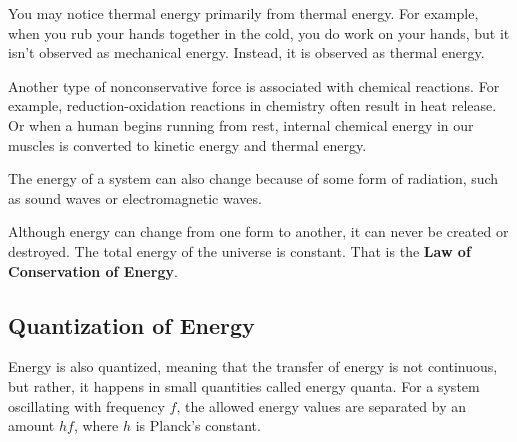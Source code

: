 \documentclass[11pt]{article}
\begin{document}
You may notice thermal energy primarily from thermal energy. For example, when you rub your hands together in the cold, you do work on your hands, but it isn't observed as mechanical energy. Instead, it is observed as thermal energy. 

Another type of nonconservative force is associated with chemical reactions. For example, reduction-oxidation reactions in chemistry often result in heat release. Or when a human begins running from rest, internal chemical energy in our muscles is converted to kinetic energy and thermal energy.

The energy of a system can also change because of some form of radiation, such as sound waves or electromagnetic waves.


Although energy can change from one form to another, it can never be created or destroyed. The total energy of the universe is constant. That is the \textbf{Law of Conservation of Energy}. 

\subsection{Quantization of Energy}
Energy is also quantized, meaning that the transfer of energy is not continuous, but rather, it happens in small quantities called energy quanta. For a system oscillating with frequency $f$, the allowed energy values are separated by an amount $hf$, where $h$ is Planck's constant.
\end{document}
